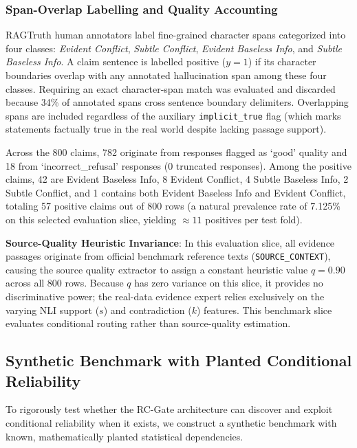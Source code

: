 \documentclass[pdflatex,sn-mathphys,Numbered]{sn-jnl}
\begin{document}
\subsubsection{Span-Overlap Labelling and Quality Accounting}
RAGTruth human annotators label fine-grained character spans categorized into four classes: \emph{Evident Conflict}, \emph{Subtle Conflict}, \emph{Evident Baseless Info}, and \emph{Subtle Baseless Info}. A claim sentence is labelled positive ($y=1$) if its character boundaries overlap with any annotated hallucination span among these four classes. Requiring an exact character-span match was evaluated and discarded because 34\% of annotated spans cross sentence boundary delimiters. Overlapping spans are included regardless of the auxiliary \texttt{implicit\_true} flag (which marks statements factually true in the real world despite lacking passage support).

Across the 800 claims, 782 originate from responses flagged as `good' quality and 18 from `incorrect\_refusal' responses (0 truncated responses). Among the positive claims, 42 are Evident Baseless Info, 8 Evident Conflict, 4 Subtle Baseless Info, 2 Subtle Conflict, and 1 contains both Evident Baseless Info and Evident Conflict, totaling 57 positive claims out of 800 rows (a natural prevalence rate of 7.125\% on this selected evaluation slice, yielding $\approx 11$ positives per test fold).

\noindent \textbf{Source-Quality Heuristic Invariance}: In this evaluation slice, all evidence passages originate from official benchmark reference texts (\texttt{SOURCE\_CONTEXT}), causing the source quality extractor to assign a constant heuristic value $q = 0.90$ across all 800 rows. Because $q$ has zero variance on this slice, it provides no discriminative power; the real-data evidence expert relies exclusively on the varying NLI support ($s$) and contradiction ($k$) features. This benchmark slice evaluates conditional routing rather than source-quality estimation.

\subsection{Synthetic Benchmark with Planted Conditional Reliability}\label{subsec:synthetic_ds}

To rigorously test whether the RC-Gate architecture can discover and exploit conditional reliability when it exists, we construct a synthetic benchmark with known, mathematically planted statistical dependencies. 
\end{document}
